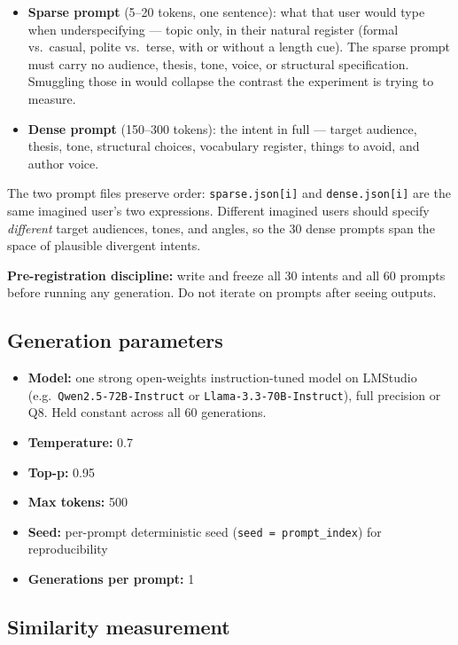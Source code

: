 \documentclass[11pt]{article}
\begin{document}
\begin{itemize}[leftmargin=*,itemsep=2pt,topsep=4pt]
  \item \textbf{Sparse prompt} (5--20 tokens, one sentence): what that user would type when underspecifying --- topic only, in their natural register (formal vs.\ casual, polite vs.\ terse, with or without a length cue). The sparse prompt must carry no audience, thesis, tone, voice, or structural specification. Smuggling those in would collapse the contrast the experiment is trying to measure.
  \item \textbf{Dense prompt} (150--300 tokens): the intent in full --- target audience, thesis, tone, structural choices, vocabulary register, things to avoid, and author voice.
\end{itemize}

The two prompt files preserve order: \texttt{sparse.json[i]} and \texttt{dense.json[i]} are the same imagined user's two expressions. Different imagined users should specify \emph{different} target audiences, tones, and angles, so the 30 dense prompts span the space of plausible divergent intents.

\textbf{Pre-registration discipline:} write and freeze all 30 intents and all 60 prompts before running any generation. Do not iterate on prompts after seeing outputs.

\subsection{Generation parameters}

\begin{itemize}[leftmargin=*,itemsep=2pt,topsep=4pt]
  \item \textbf{Model:} one strong open-weights instruction-tuned model on LMStudio (e.g.\ \texttt{Qwen2.5-72B-Instruct} or \texttt{Llama-3.3-70B-Instruct}), full precision or Q8. Held constant across all 60 generations.
  \item \textbf{Temperature:} 0.7
  \item \textbf{Top-p:} 0.95
  \item \textbf{Max tokens:} 500
  \item \textbf{Seed:} per-prompt deterministic seed (\texttt{seed = prompt\_index}) for reproducibility
  \item \textbf{Generations per prompt:} 1
\end{itemize}

\subsection{Similarity measurement}
\end{document}
